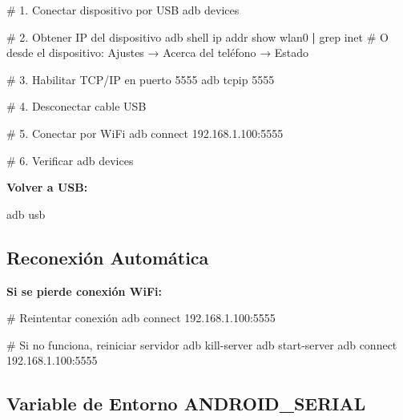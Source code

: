 \documentclass[
  doc,
  floatsintext,
  longtable,
  a4paper,
  nolmodern,
  notxfonts,
  notimes,
  12pt,
  colorlinks=true,linkcolor=blue,citecolor=blue,urlcolor=blue]{apa7}
\newenvironment{Shaded}{\begin{snugshade}}{\end{snugshade}}
\newcommand{\CommentTok}[1]{\textcolor[rgb]{0.37,0.37,0.37}{#1}}
\newcommand{\ExtensionTok}[1]{\textcolor[rgb]{0.00,0.23,0.31}{#1}}
\newcommand{\FunctionTok}[1]{\textcolor[rgb]{0.28,0.35,0.67}{#1}}
\newcommand{\KeywordTok}[1]{\textcolor[rgb]{0.00,0.23,0.31}{\textbf{#1}}}
\newcommand{\NormalTok}[1]{\textcolor[rgb]{0.00,0.23,0.31}{#1}}
\begin{document}
\begin{Shaded}
\begin{Highlighting}[]
\CommentTok{\# 1. Conectar dispositivo por USB}
\ExtensionTok{adb}\NormalTok{ devices}

\CommentTok{\# 2. Obtener IP del dispositivo}
\ExtensionTok{adb}\NormalTok{ shell ip addr show wlan0 }\KeywordTok{|} \FunctionTok{grep}\NormalTok{ inet}
\CommentTok{\# O desde el dispositivo: Ajustes → Acerca del teléfono → Estado}

\CommentTok{\# 3. Habilitar TCP/IP en puerto 5555}
\ExtensionTok{adb}\NormalTok{ tcpip 5555}

\CommentTok{\# 4. Desconectar cable USB}

\CommentTok{\# 5. Conectar por WiFi}
\ExtensionTok{adb}\NormalTok{ connect 192.168.1.100:5555}

\CommentTok{\# 6. Verificar}
\ExtensionTok{adb}\NormalTok{ devices}
\end{Highlighting}
\end{Shaded}

\textbf{Volver a USB:}

\begin{Shaded}
\begin{Highlighting}[]
\ExtensionTok{adb}\NormalTok{ usb}
\end{Highlighting}
\end{Shaded}

\subsection{Reconexión Automática}\label{reconexiuxf3n-automuxe1tica}

\textbf{Si se pierde conexión WiFi:}

\begin{Shaded}
\begin{Highlighting}[]
\CommentTok{\# Reintentar conexión}
\ExtensionTok{adb}\NormalTok{ connect 192.168.1.100:5555}

\CommentTok{\# Si no funciona, reiniciar servidor}
\ExtensionTok{adb}\NormalTok{ kill{-}server}
\ExtensionTok{adb}\NormalTok{ start{-}server}
\ExtensionTok{adb}\NormalTok{ connect 192.168.1.100:5555}
\end{Highlighting}
\end{Shaded}

\subsection{Variable de Entorno
ANDROID\_SERIAL}\label{variable-de-entorno-android_serial}
\end{document}
